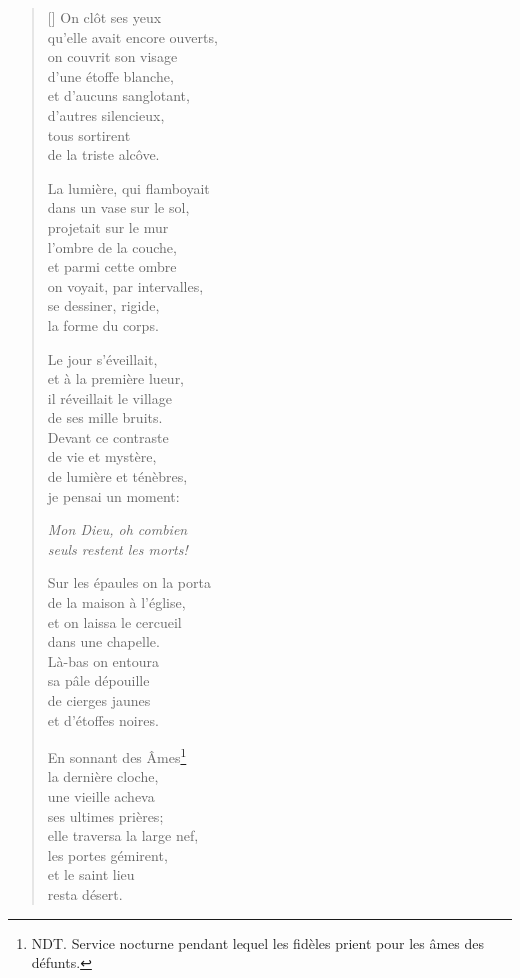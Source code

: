 \documentclass[a4paper,12pt]{book}
\begin{document}
\settowidth{\versewidth}{D'une horloge on entendait}

\begin{verse}[\versewidth]
  On clôt ses yeux \\
  qu'elle avait encore ouverts, \\
  on couvrit son visage \\
  d'une étoffe blanche, \\
  et d'aucuns sanglotant, \\
  d'autres silencieux, \\
  tous sortirent \\
  de la triste alcôve.

  La lumière, qui flamboyait \\
  dans un vase sur le sol, \\
  projetait sur le mur \\
  l'ombre de la couche, \\
  et parmi cette ombre \\
  on voyait, par intervalles, \\
  se dessiner, rigide, \\
  la forme du corps.

  Le jour s'éveillait, \\
  et à la première lueur, \\
  il réveillait le village \\
  de ses mille bruits. \\
  Devant ce contraste \\
  de vie et mystère, \\
  de lumière et ténèbres, \\
  je pensai un moment:

  \emph{Mon Dieu, oh combien \\
  seuls restent les morts!}

  Sur les épaules on la porta \\
  de la maison à l'église, \\
  et on laissa le cercueil \\
  dans une chapelle. \\
  Là-bas on entoura \\
  sa pâle dépouille \\
  de cierges jaunes \\
  et d'étoffes noires.

  En sonnant des Âmes\footnote{NDT. Service nocturne pendant lequel les
  fidèles prient pour les âmes des défunts.} \\
  la dernière cloche, \\
  une vieille acheva \\
  ses ultimes prières; \\
  elle traversa la large nef, \\
  les portes gémirent, \\
  et le saint lieu \\
  resta désert.


\end{verse}
\end{document}
